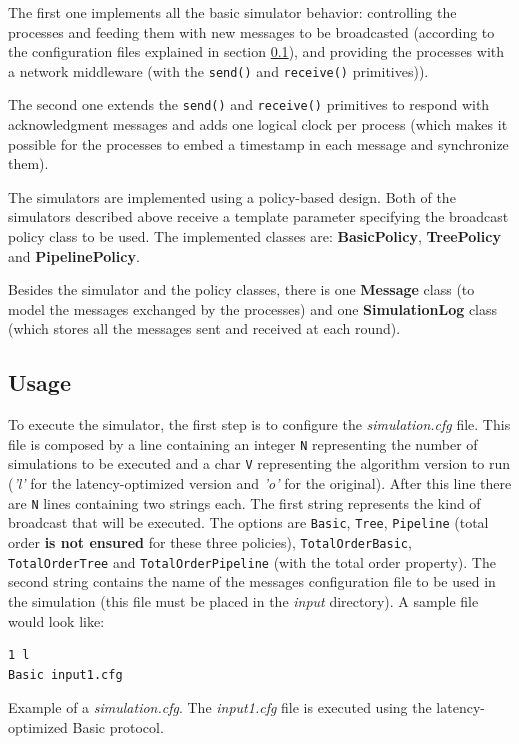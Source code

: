 \documentclass[a4paper, 11pt]{article}
\begin{document}
	The first one implements all the basic simulator behavior: controlling the processes and feeding them with new messages to be broadcasted (according to the configuration files explained in section \ref{subsec:usage}), and providing the processes with a network middleware (with the \texttt{send()} and \texttt{receive()} primitives)). 
	
	The second one extends the \texttt{send()} and \texttt{receive()} primitives to respond with acknowledgment messages and adds one logical clock per process (which makes it possible for the processes to embed a timestamp in each message and synchronize them).

	The simulators are implemented using a policy-based design. Both of the simulators described above receive a template parameter specifying the broadcast policy class to be used. The implemented classes are: \textbf{BasicPolicy}, \textbf{TreePolicy} and \textbf{PipelinePolicy}.
	
	Besides the simulator and the policy classes, there is one \textbf{Message} class (to model the messages exchanged by the processes) and one \textbf{SimulationLog} class (which stores all the messages sent and received at each round).


\subsection{Usage}
\label{subsec:usage}
	To execute the simulator, the first step is to configure the \textit{simulation.cfg} file. This file is composed by a line containing an integer \texttt{N} representing the number of simulations to be executed and a char \texttt{V} representing the algorithm version to run (\textit{'l'} for the latency-optimized version and \textit{'o'} for the original). After  this line there are \texttt{N} lines containing two strings each. The first string represents the kind of broadcast that will be executed. The options are \texttt{Basic}, \texttt{Tree}, \texttt{Pipeline} (total order \textbf{is not ensured} for these three policies), \texttt{TotalOrderBasic}, \texttt{TotalOrderTree} and \texttt{TotalOrderPipeline} (with the total order property). The second string contains the name of the messages configuration file to be used in the simulation (this file must be placed in the \textit{input} directory). A sample file would look like:

\begin{file}
\begin{verbatim}
1 l
Basic input1.cfg
\end{verbatim}
\caption{Example of a \textit{simulation.cfg}. The \textit{input1.cfg} file is executed using the latency-optimized Basic protocol.}
\end{file}
\end{document}
